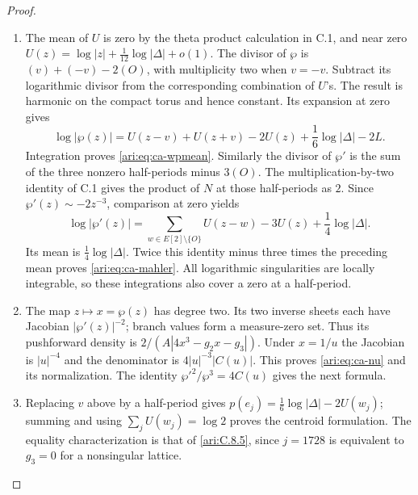 \begin{proof}
\begin{enumerate}[label=\arabic*.,leftmargin=*]
\item The mean of $U$ is zero by the theta product calculation in C.1,
and near zero
$U(z)=\log|z|+\frac1{12}\log|\Delta|+o(1)$.
The divisor of $\wp$ is $(v)+(-v)-2(O)$, with multiplicity
two when $v=-v$. Subtract its logarithmic divisor from the
corresponding combination of $U$'s. The result is harmonic
on the compact torus and hence constant. Its expansion at
zero gives
\[
 \log|\wp(z)|=U(z-v)+U(z+v)-2U(z)
                  +\frac16\log|\Delta|-2L.
\]
Integration proves \eqref{ari:eq:ca-wpmean}.
Similarly the divisor of $\wp'$ is the sum of the three
nonzero half-periods minus $3(O)$. The multiplication-by-two
identity of C.1 gives the product of $N$ at those half-periods
as $2$. Since $\wp'(z)\sim-2z^{-3}$, comparison at zero yields
\[
 \log|\wp'(z)|=\sum_{w\in E[2]\setminus\{O\}}U(z-w)-3U(z)
                         +\frac14\log|\Delta|.
\]
Its mean is $\frac14\log|\Delta|$. Twice this identity minus
three times the preceding mean proves \eqref{ari:eq:ca-mahler}.
All logarithmic singularities are locally integrable, so these
integrations also cover a zero at a half-period.

\item The map $z\mapsto x=\wp(z)$ has degree two. Its two inverse
sheets each have Jacobian $|\wp'(z)|^{-2}$; branch values form
a measure-zero set. Thus its pushforward density is
$2/(A|4x^3-g_2x-g_3|)$. Under $x=1/u$ the Jacobian is
$|u|^{-4}$ and the denominator is $4|u|^{-3}|C(u)|$.
This proves \eqref{ari:eq:ca-nu} and its normalization. The identity
$\wp'^2/\wp^3=4C(u)$ gives the next formula.

\item Replacing $v$ above by a half-period gives
$p(e_j)=\frac16\log|\Delta|-2U(w_j)$; summing and using
$\sum_jU(w_j)=\log2$ proves the centroid formulation.
The equality characterization is that of \ref{ari:C.8.5},
since $j=1728$ is equivalent to $g_3=0$ for a nonsingular lattice.
\end{enumerate}
\end{proof}

